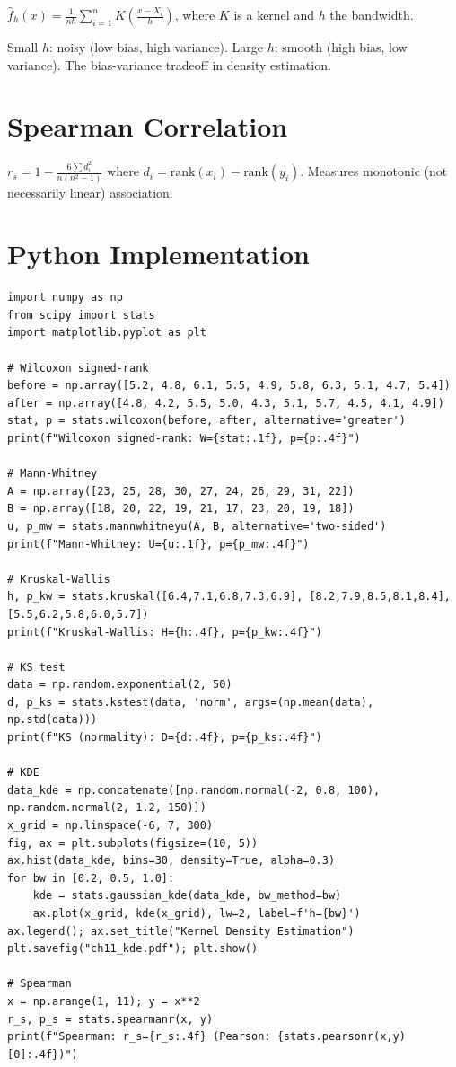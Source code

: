 \begin{definition}
$\hat{f}_h(x) = \frac{1}{nh}\sum_{i=1}^n K\!\left(\frac{x-X_i}{h}\right)$, where $K$ is a kernel and $h$ the bandwidth.
\end{definition}

\begin{intuition}
Small $h$: noisy (low bias, high variance). Large $h$: smooth (high bias, low variance). The bias-variance tradeoff in density estimation.
\end{intuition}

\section{Spearman Correlation}

$r_s = 1-\frac{6\sum d_i^2}{n(n^2-1)}$ where $d_i=\text{rank}(x_i)-\text{rank}(y_i)$. Measures monotonic (not necessarily linear) association.

\section{Python Implementation}

\begin{python}
\begin{verbatim}
import numpy as np
from scipy import stats
import matplotlib.pyplot as plt

# Wilcoxon signed-rank
before = np.array([5.2, 4.8, 6.1, 5.5, 4.9, 5.8, 6.3, 5.1, 4.7, 5.4])
after = np.array([4.8, 4.2, 5.5, 5.0, 4.3, 5.1, 5.7, 4.5, 4.1, 4.9])
stat, p = stats.wilcoxon(before, after, alternative='greater')
print(f"Wilcoxon signed-rank: W={stat:.1f}, p={p:.4f}")

# Mann-Whitney
A = np.array([23, 25, 28, 30, 27, 24, 26, 29, 31, 22])
B = np.array([18, 20, 22, 19, 21, 17, 23, 20, 19, 18])
u, p_mw = stats.mannwhitneyu(A, B, alternative='two-sided')
print(f"Mann-Whitney: U={u:.1f}, p={p_mw:.4f}")

# Kruskal-Wallis
h, p_kw = stats.kruskal([6.4,7.1,6.8,7.3,6.9], [8.2,7.9,8.5,8.1,8.4], [5.5,6.2,5.8,6.0,5.7])
print(f"Kruskal-Wallis: H={h:.4f}, p={p_kw:.4f}")

# KS test
data = np.random.exponential(2, 50)
d, p_ks = stats.kstest(data, 'norm', args=(np.mean(data), np.std(data)))
print(f"KS (normality): D={d:.4f}, p={p_ks:.4f}")

# KDE
data_kde = np.concatenate([np.random.normal(-2, 0.8, 100), np.random.normal(2, 1.2, 150)])
x_grid = np.linspace(-6, 7, 300)
fig, ax = plt.subplots(figsize=(10, 5))
ax.hist(data_kde, bins=30, density=True, alpha=0.3)
for bw in [0.2, 0.5, 1.0]:
    kde = stats.gaussian_kde(data_kde, bw_method=bw)
    ax.plot(x_grid, kde(x_grid), lw=2, label=f'h={bw}')
ax.legend(); ax.set_title("Kernel Density Estimation")
plt.savefig("ch11_kde.pdf"); plt.show()

# Spearman
x = np.arange(1, 11); y = x**2
r_s, p_s = stats.spearmanr(x, y)
print(f"Spearman: r_s={r_s:.4f} (Pearson: {stats.pearsonr(x,y)[0]:.4f})")
\end{verbatim}
\end{python}


